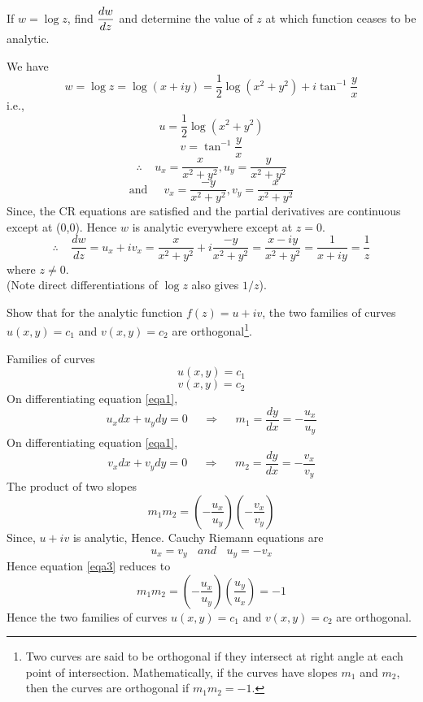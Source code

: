 \begin{example}
If $w=\log z$, find $\displaystyle \frac{dw}{dz}$ and determine the value of $z$ at which function ceases to be analytic.
\end{example}
\begin{solution}
We have
\[w=\log z = \log (x+iy) = \frac{1}{2}\log(x^2+y^2)+i \tan^{-1}\frac{y}{x}\]
i.e.,
\[u =\frac{1}{2}\log(x^2+y^2) \]
\[v= \tan^{-1}\frac{y}{x}\]
\[\therefore \;\;\;\; u_x = \frac{x}{x^2+y^2}, u_y =\frac{y}{x^2+y^2}\]
\[\text{and } \;\;\;\; v_x = \frac{-y}{x^2+y^2}, v_y =\frac{x}{x^2+y^2}\]
Since, the CR equations are satisfied and the partial derivatives are continuous except at (0,0). Hence $w$ is analytic everywhere except at $z=0$.
\[\therefore \;\;\;\; \frac{dw}{dz}=u_x+iv_x = \frac{x}{x^2+y^2} + i \frac{-y}{x^2+y^2} =\frac{x-iy}{x^2+y^2} = \frac{1}{x+iy} = \frac{1}{z} \]
where $z\neq 0$. \\
(Note direct differentiations of $\log z$ also gives $1/z$).
\end{solution}

\begin{example}
Show that for the analytic function $f(z)=u+iv$, the two families of curves $u(x,y)=c_1$ and $v(x,y)=c_2$ are orthogonal\footnote{Two curves are said to be orthogonal if they intersect at right angle at each point of intersection. Mathematically, if the curves have slopes $m_1$ and $m_2$, then the curves are orthogonal if $m_1m_2=-1$.}.
\end{example}
\begin{solution}
Families of curves
\begin{equation}\label{eqa1}
u(x,y)=c_1
\end{equation}
\begin{equation}\label{eqa2}
v(x,y)=c_2
\end{equation}
On differentiating equation \ref{eqa1},
\begin{equation}u_xdx+u_ydy=0~~~~~~\Rightarrow~~~~~~ m_1 = \frac{dy}{dx} = - \frac{u_x}{u_y}\end{equation}
On differentiating equation \ref{eqa1},
\begin{equation}v_xdx+v_ydy=0~~~~~~\Rightarrow~~~~~~ m_2 = \frac{dy}{dx} = - \frac{v_x}{v_y}\end{equation}
The product of two slopes
\begin{equation}\label{eqa3}
m_1m_2 = \left(- \frac{u_x}{u_y}\right)\left(- \frac{v_x}{v_y}\right) 
\end{equation}
Since, $u + iv$ is analytic, Hence. Cauchy Riemann equations are 
\[u_x = v_y~~~~and ~~~~ u_y=-v_x\]
Hence equation \ref{eqa3} reduces to
\[m_1m_2 =\left(- \frac{u_x}{u_y}\right)\left( \frac{u_y}{u_x}\right)  = -1 \]
Hence the two families of curves $u(x,y)=c_1$ and $v(x,y)=c_2$ are orthogonal.
\end{solution}

